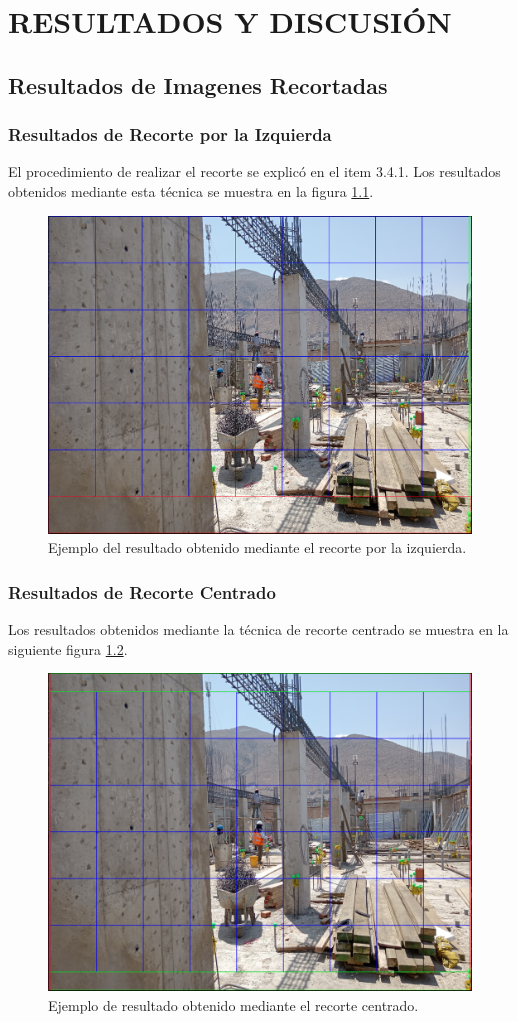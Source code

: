 \chapter{RESULTADOS Y DISCUSIÓN}

\section{Resultados de Imagenes Recortadas}

\subsection{Resultados de Recorte por la Izquierda}

El procedimiento de realizar el recorte se explicó en el item 3.4.1. Los resultados obtenidos mediante esta técnica se muestra en la figura \ref{fig:left_use}.

\begin{figure}[!ht]
  \centering
  \includegraphics[width=.49\linewidth]{images/left_use.png}
  \caption{Ejemplo del resultado obtenido mediante el recorte por la izquierda.}
  \label{fig:left_use}
\end{figure}

\subsection{Resultados de Recorte Centrado}

Los resultados obtenidos mediante la técnica de recorte centrado se muestra en la siguiente figura \ref{fig:center_use}.

\begin{figure}[!ht]
  \centering
  \includegraphics[width=.49\linewidth]{images/center_use.png}
  \caption{Ejemplo de resultado obtenido mediante el recorte centrado.}
  \label{fig:center_use}
\end{figure}


